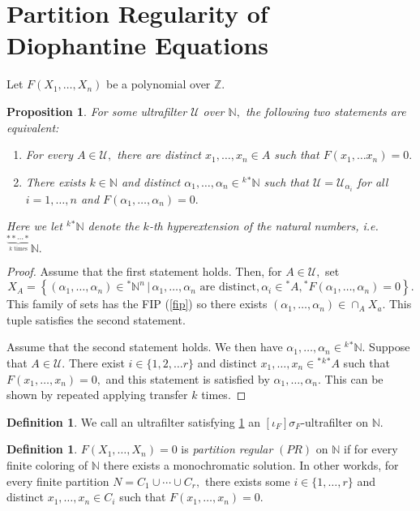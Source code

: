\documentclass[12pt]{amsart}
\newcommand{\stt}{{}^*}
\newcommand{\NN}{\mathbb{N}}
\newcommand{\ZZ}{\mathbb{Z}}
\newcommand{\mcU}{\mathcal{U}}
\theoremstyle{plain}
\newtheorem{prop}[thm]{Proposition}
\theoremstyle{definition}
\newtheorem{defn}[thm]{Definition}
\theoremstyle{remark}
\theoremstyle{theorem}
\numberwithin{equation}{section}
\numberwithin{thm}{section}
\begin{document}
\section{Partition Regularity of Diophantine Equations}
Let $F(X_1, \ldots, X_n)$ be a polynomial over $\ZZ.$
\begin{prop}
For some ultrafilter $\mcU$ over $\NN,$ the following two statements are equivalent: \label{sigmauf}
\begin{enumerate}
    \item For every $A \in \mcU,$ there are distinct $x_1, \ldots, x_n \in A$ such that $F(x_1, \ldots x_n)=0.$
    \item There exists $k \in \NN$ and distinct $\alpha_1, \ldots, \alpha_n \in {}^k\stt \NN$ such that $\mcU = \mcU_{\alpha_i}$ for all $i = 1, \ldots, n$ and $F(\alpha_1, \ldots, \alpha_n)=0.$
\end{enumerate}
Here we let $^k \stt \NN$ denote the $k$-th hyperextension of the natural numbers, i.e. ${}^{\underset{k \text{ times}}{\underbrace{**\cdots *}}}\NN.$
\end{prop}
\begin{proof}
Assume that the first statement holds. Then, for $A \in \mcU,$ set
\[X_A = \left \{ (\alpha_1, \ldots , \alpha_n ) \in \stt \NN ^n \, | \, \alpha_1, \ldots , \alpha_n \text{ are distinct}, \alpha_i \in \stt A, \stt F(\alpha_1, \ldots , \alpha_n) =0\right \}. \]
This family of sets has the FIP (\ref{fip}) so there exists $(\alpha_1, \ldots, \alpha_n) \in \cap_A X_a.$ This tuple satisfies the second statement.

Assume that the second statement holds. We then have $\alpha_1, \ldots , \alpha_n \in {}^k \stt \NN.$ Suppose that $A \in \mcU.$ There exist $i \in \{1,2 , \ldots r\}$ and distinct $x_1, \ldots, x_n \in \stt {}^k \stt A$ such that $F(x_1, \ldots , x_n)=0,$ and this statement is satisfied by $\alpha_1, \ldots , \alpha_n.$ This can be shown by repeated applying transfer $k$ times. 

\end{proof}
\begin{defn}
We call an ultrafilter satisfying \ref{sigmauf} an $[\iota_F]\sigma_F$-ultrafilter on $\NN.$
\end{defn}
\begin{defn}
$F(X_1, \ldots , X_n)=0$ is \textit{partition regular} $(PR)$ on $\NN$ if for every finite coloring of $\NN$ there exists a monochromatic solution. In other workds, for every finite partition $N = C_1 \cup \cdots \cup C_r,$ there exists some $i \in \{ 1, \ldots , r\}$ and distinct $x_1, \ldots , x_n \in C_i$ such that $F(x_1, \ldots , x_n) = 0.$
\end{defn}
\end{document}
